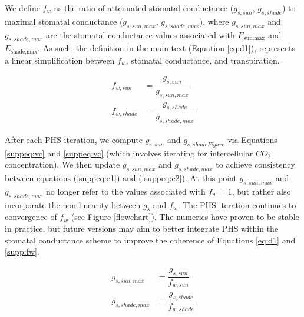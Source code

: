 \documentclass[draft,linenumbers]{agujournal}
\begin{document}
We define $f_w$ as the ratio of attenuated stomatal conductance ($g_{s,sun}$, $g_{s,shade}$) to maximal stomatal conductance ($g_{s,sun,max}$, $g_{s,shade,max}$),
where $g_{s,sun,max}$ and $g_{s,shade,max}$ are the stomatal conductance values associated with $E_{\text{sun,max}}$ and $E_{\text{shade,max}}$.
As such, the definition in the main text (Equation \ref{eq:d1}), represents a linear simplification between $f_w$, stomatal conductance, and transpiration.

    \begin{equation}
    \begin{aligned}
    \label{supp:fw}
    f_{w,sun} &= \dfrac{g_{s,sun}}{g_{s,sun,max}}    \\
    f_{w,shade} &= \dfrac{g_{s,shade}}{g_{s,shade,max}}
    \end{aligned}
    \end{equation}

After each PHS iteration, we compute $g_{s,sun}$ and $g_{s,shadeFigure}$ via Equations \ref{suppeq:vc} and \ref{suppeq:vc} (which involves iterating for intercellular $CO_2$ concentration).
We then update $g_{s,sun,max}$ and $g_{s,shade,max}$ to achieve consistency between equations (\ref{suppeq:e1}) and (\ref{suppeq:e2}).
At this point $g_{s,sun,max}$ and $g_{s,shade,max}$ no longer refer to the values associated with $f_w=1$, but rather also incorporate the non-linearity between $g_s$ and $f_w$.
The PHS iteration continues to convergence of $f_w$ (see Figure \ref{flowchart}).
The numerics have proven to be stable in practice, but future versions may aim to better integrate PHS within the stomatal conductance scheme to improve the coherence of Equations \ref{eq:d1} and \ref{supp:fw}.

    \begin{equation}
    \begin{aligned}
    g_{s,sun,max} &= \dfrac{g_{s,sun}}{f_{w,sun}} \\
    g_{s,shade,max} &= \dfrac{g_{s,shade}}{f_{w,shade}} \\
    \end{aligned}
    \end{equation}
    
\end{document}
